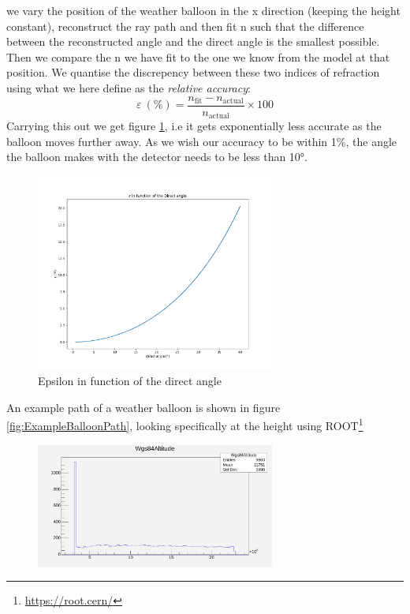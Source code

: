 \documentclass[11pt,a4paper,faculty=we,language=en,doctype=report]{cls/ugent-doc}
\begin{document}
we vary the position of the weather balloon in the x direction (keeping the
height constant), reconstruct the ray path and then fit n such that the
difference between the reconstructed angle and the direct angle is the smallest
possible.  Then we compare the n we have fit to the one we know from the model
at that position.  We quantise the discrepency between these two indices of
refraction using what we here define as the \textit{relative accuracy}:
\begin{equation}
  \varepsilon\ (\%) = \frac{n_\text{fit} - n_{\text{actual}}}{n_{\text{actual}}} \times 100
\end{equation}
Carrying this out we get figure \ref{fig:EpsilonIFODirect}, i.e it gets
exponentially less accurate as the balloon moves further away. As we wish our
accuracy to be within 1\%, the angle the balloon makes with the detector needs
to be less than 10°.
\begin{figure}
	\centering
	\includegraphics[width=0.7\textwidth]{EpsilonIFODirect.pdf}
	\caption{Epsilon in function of the direct angle}
	\label{fig:EpsilonIFODirect}
\end{figure}
An example path of a weather balloon is shown in figure
\ref{fig:ExampleBalloonPath}, looking specifically at the height using ROOT\footnote{\url{https://root.cern/}}
\begin{figure}
  \centering
  \includegraphics[width=0.7\textwidth]{BobsWeatherBalloonHeight.pdf}
  \label{fig:BobsWeatherBalloonHeight}
\end{figure}
\end{document}
